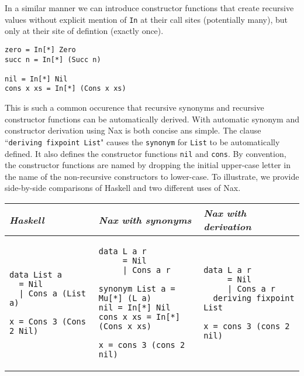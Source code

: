 In a similar manner we can introduce constructor functions that create
recursive values without explicit mention of \verb+In+ at their
call sites (potentially many), but only at their site of defintion (exactly once).

{\small
\begin{verbatim}
zero = In[*] Zero
succ n = In[*] (Succ n)

nil = In[*] Nil
cons x xs = In[*] (Cons x xs)
\end{verbatim}}
This is such a common occurence that recursive synonyms and recursive constructor functions
can be automatically derived. With automatic synonym and constructor derivation
using Nax is both concise ans simple. The clause ``\verb+deriving fixpoint List+"
causes the \verb+synonym+ for \verb+List+ to be automatically defined. It
also defines the constructor functions \verb+nil+ and \verb+cons+.
By convention, the constructor functions are named by dropping the initial
upper-case letter in the name of the non-recursive constructors to lower-case.
To illustrate, we provide side-by-side comparisons
of Haskell and two different uses of Nax.

\vspace*{0.1in}
\begin{tabular}{l|l|l}
{\em Haskell}  & {\em Nax with synonyms} &  {\em Nax with derivation} \\ \hline
\begin{minipage}[t]{.26\linewidth}
{\small
\begin{verbatim}
data List a 
  = Nil 
  | Cons a (List a)
  
x = Cons 3 (Cons 2 Nil)  
\end{verbatim}}
\end{minipage}

& 

\begin{minipage}[t]{.34\linewidth}
{\small
\begin{verbatim}
data L a r 
     = Nil 
     | Cons a r
  
synonym List a = Mu[*] (L a)
nil = In[*] Nil
cons x xs = In[*] (Cons x xs)

x = cons 3 (cons 2 nil)  
\end{verbatim}}
\end{minipage}

&

\begin{minipage}[t]{.26\linewidth}
{\small
\begin{verbatim}
data L a r 
     = Nil 
     | Cons a r
  deriving fixpoint List

x = cons 3 (cons 2 nil)    
\end{verbatim}}
\end{minipage}

\end{tabular}


